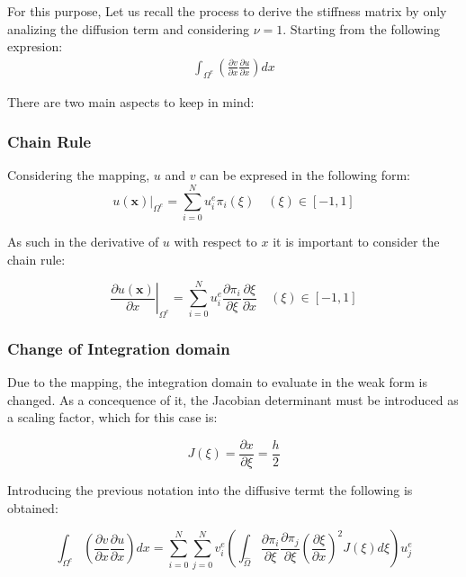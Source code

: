 \documentclass[
  a4paper,
  10pt]{article}
\begin{document}
For this purpose, Let us recall the process to derive the stiffness
matrix by only analizing the diffusion term and considering \(\nu=1\).
Starting from the following expresion: \begin{align}
\int_{\Omega^{e}} ( \frac{\partial v}{\partial x}\frac{\partial u}{\partial x})dx
\end{align}

There are two main aspects to keep in mind:

\hypertarget{chain-rule}{%
\subsubsection{Chain Rule}\label{chain-rule}}

Considering the mapping, \(u\) and \(v\) can be expresed in the
following form: \begin{equation}
\left.u(\textbf{x})\right\rvert_{\Omega^{e}}=\sum_{i=0}^{N}u_{i}^{e} \pi_{i}(\xi)  \quad (\xi) \in [-1,1]
\end{equation}

As such in the derivative of \(u\) with respect to \(x\) it is important
to consider the chain rule:

\begin{equation}
\left. \frac{\partial u(\textbf{x})}{\partial x}\right\rvert_{\Omega^{e}}=\sum_{i=0}^{N} u_{i}^{e} \frac{\partial \pi_{i}}{\partial\xi}\frac{\partial\xi}{\partial x}  \quad (\xi) \in [-1,1]
\end{equation}

\hypertarget{change-of-integration-domain}{%
\subsubsection{Change of Integration
domain}\label{change-of-integration-domain}}

Due to the mapping, the integration domain to evaluate in the weak form
is changed. As a concequence of it, the Jacobian determinant must be
introduced as a scaling factor, which for this case is:

\begin{equation}
J(\xi)=\frac{\partial x}{\partial \xi}=\frac{h}{2}
\end{equation}

Introducing the previous notation into the diffusive termt the following
is obtained:

\begin{equation}
\int_{\Omega^{e}} ( \frac{\partial v}{\partial x}\frac{\partial u}{\partial x})dx = \sum_{i=0}^{N}\sum_{j=0}^{N} v_i^{e}( \int_{\hat{\Omega}}\frac{\partial \pi_{i}}{\partial\xi}\frac{\partial \pi_{j}}{\partial\xi}(\frac{\partial\xi}{\partial x})^{2} J(\xi) d\xi)u_j^{e}
\end{equation}
\end{document}
